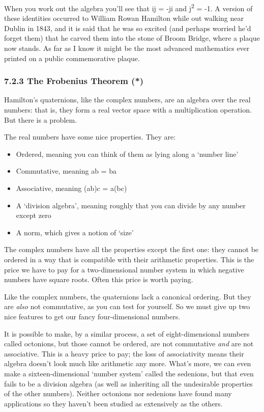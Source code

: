 \documentclass[oneside,english]{amsbook}
\numberwithin{section}{chapter}
\theoremstyle{plain}
\theoremstyle{definition}
\begin{document}
When you work out the algebra you'll see that ij = -ji and
j\textsuperscript{2} = -1. A version of these identities occurred to
William Rowan Hamilton while out walking near Dublin in 1843, and it is
said that he was so excited (and perhaps worried he'd forget them) that
he carved them into the stone of Broom Bridge, where a plaque now
stands. As far as I know it might be the most advanced mathematics ever
printed on a public commemorative plaque.

\subsubsection{7.2.3 The Frobenius Theorem
	(*)}\label{the-frobenius-theorem}

Hamilton's quaternions, like the complex numbers, are an algebra over
the real numbers: that is, they form a real vector space with a
multiplication operation. But there is a problem.

The real numbers have some nice properties. They are:

\begin{itemize}
	\item
	Ordered, meaning you can think of them as lying along a `number
	line'
	\item
	Commutative, meaning ab = ba
	\item
	Associative, meaning (ab)c = a(bc)
	\item
	A `division algebra', meaning roughly that you can divide by any
	number except zero
	\item
	A norm, which gives a notion of `size'
\end{itemize}

The complex numbers have all the properties except the first one: they
cannot be ordered in a way that is compatible with their arithmetic
properties. This is the price we have to pay for a two-dimensional
number system in which negative numbers have square roots. Often this
price is worth paying.

Like the complex numbers, the quaternions lack a canonical ordering. But
they are \emph{also} not commutative, as you can test for yourself. So
we must give up two nice features to get our fancy four-dimensional
numbers.

It is possible to make, by a similar process, a set of eight-dimensional
numbers called octonions, but those cannot be ordered, are not
commutative \emph{and} are not associative. This is a heavy price to
pay; the loss of associativity means their algebra doesn't look much
like arithmetic any more. What's more, we can even make a
sixteen-dimensional `number system' called the sedenions, but that
even fails to be a division algebra (as well as inheriting all the
undesirable properties of the other numbers). Neither octonions nor
sedenions have found many applications so they haven't been studied as
extensively as the others.
\end{document}
